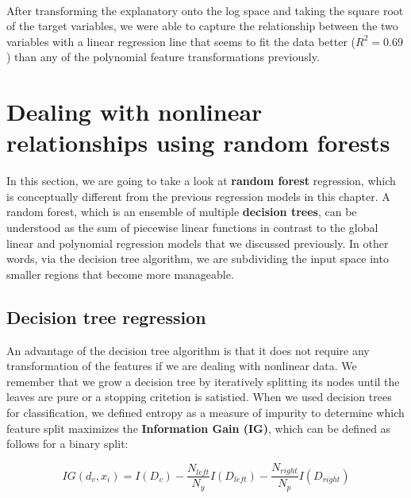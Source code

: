 \documentclass[11pt]{article}
\begin{document}
    \begin{center}
    \end{center}
    { \hspace*{\fill} \\}
    
    After transforming the explanatory onto the log space and taking the
square root of the target variables, we were able to capture the
relationship between the two variables with a linear regression line
that seems to fit the data better (\(R^2=0.69\)) than any of the
polynomial feature transformations previously.

    \section{Dealing with nonlinear relationships using random
forests}\label{dealing-with-nonlinear-relationships-using-random-forests}

    In this section, we are going to take a look at \textbf{random forest}
regression, which is conceptually different from the previous regression
models in this chapter. A random forest, which is an ensemble of
multiple \textbf{decision trees}, can be understood as the sum of
piecewise linear functions in contrast to the global linear and
polynomial regression models that we discussed previously. In other
words, via the decision tree algorithm, we are subdividing the input
space into smaller regions that become more manageable.

    \subsection{Decision tree regression}\label{decision-tree-regression}

    An advantage of the decision tree algorithm is that it does not require
any transformation of the features if we are dealing with nonlinear
data. We remember that we grow a decision tree by iteratively splitting
its nodes until the leaves are pure or a stopping critetion is
satistied. When we used decision trees for classification, we defined
entropy as a measure of impurity to determine which feature split
maximizes the \textbf{Information Gain (IG)}, which can be defined as
follows for a binary split:

\[IG(d_v, x_i) = I(D_v) - \frac{N_{left}}{N_y}I(D_{left})-\frac{N_{right}}{N_p}I(D_{right})\]
\end{document}
